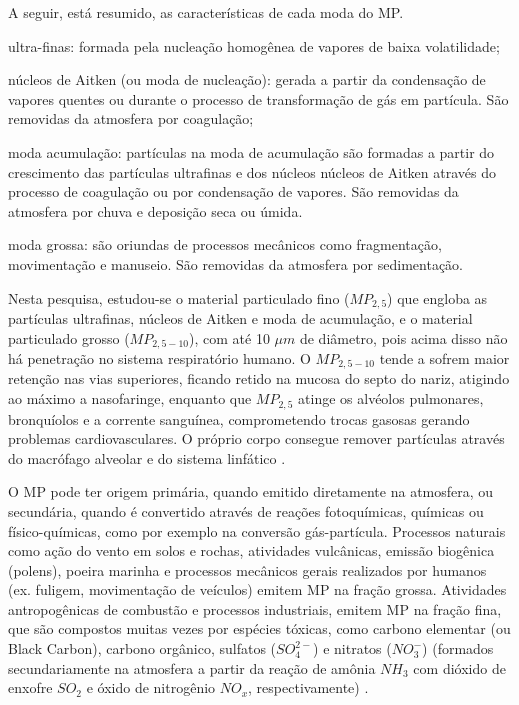 A seguir, está resumido, as características de cada moda do MP.
\begin{itemize}
\begin{spacing}{1.0}
  \item ultra-finas: formada pela nucleação homogênea de vapores de baixa 
        volatilidade;
  \item núcleos de Aitken (ou moda de nucleação): 
        gerada a partir da condensação de vapores quentes ou durante o processo 
        de transformação de gás em partícula. São removidas da atmosfera 
        por coagulação;   
  \item moda acumulação: 
        partículas na moda de acumulação são formadas a partir do crescimento 
        das partículas ultrafinas e dos núcleos núcleos de Aitken através do 
        processo de coagulação ou por condensação de vapores. São removidas da 
        atmosfera por chuva e deposição seca ou úmida.%
  \item moda grossa:
        são oriundas de processos mecânicos como fragmentação, movimentação e 
        manuseio. São removidas da atmosfera por sedimentação.
\end{spacing}
\end{itemize}

Nesta pesquisa, estudou-se o material particulado fino ($MP_{2,5}$) que 
engloba as partículas ultrafinas, núcleos de Aitken e moda de acumulação, e
o material particulado grosso ($MP_{2,5-10}$), com até 10 $\mu m$ de diâmetro, 
pois acima disso não há penetração no sistema respiratório humano. O 
$MP_{2,5-10}$ tende a sofrem maior retenção nas vias superiores, 
ficando retido na mucosa do septo do nariz, atigindo ao
máximo a nasofaringe, enquanto que $MP_{2,5}$ atinge os alvéolos pulmonares, 
bronquíolos e a corrente sanguínea, comprometendo trocas gasosas gerando
problemas cardiovasculares. O próprio corpo consegue remover partículas 
através do macrófago alveolar e do sistema linfático \citep{arbex2012}.

O MP pode ter origem primária, quando emitido diretamente na atmosfera, ou 
secundária, quando é convertido através de reações fotoquímicas, 
químicas ou físico-químicas, como por exemplo na conversão gás-partícula.
Processos naturais como ação do vento em solos e rochas, atividades vulcânicas, 
emissão biogênica (polens), poeira marinha e processos mecânicos gerais 
realizados por humanos (ex. fuligem, movimentação de veículos) emitem MP na 
fração grossa. 
Atividades antropogênicas de combustão e processos industriais, 
emitem MP na fração fina, que são compostos muitas
vezes por espécies tóxicas, como carbono elementar (ou Black Carbon), 
carbono orgânico, sulfatos ($SO_4^{2-}$) e nitratos ($NO_3^-$) (formados
secundariamente na atmosfera a partir da reação de amônia $NH_3$ com 
dióxido de enxofre $SO_2$ e óxido de nitrogênio $NO_x$, respectivamente) 
\citep{finlayson1999}. 

